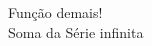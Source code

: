 \documentclass[preview]{standalone}
\begin{document}
\begin{center}
Função demais!\\ Soma da Série infinita
\end{center}
\end{document}
